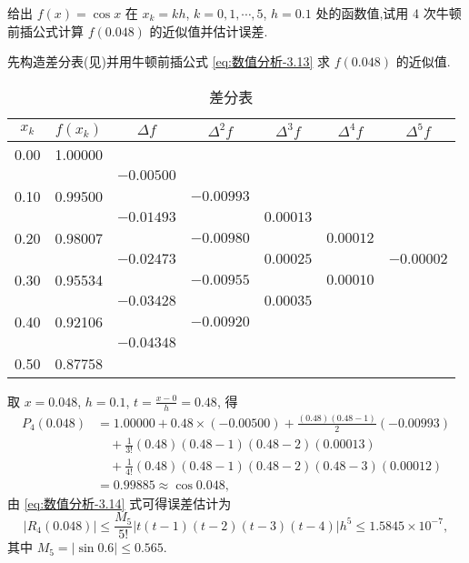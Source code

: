 \documentclass[../../main.tex]{subfiles}
\begin{document}
\begin{example}
给出 $f(x) = \cos x$ 在 $x_k = kh$, $k = 0, 1, \cdots, 5$, $h = 0.1$ 处的函数值,试用 4 次牛顿前插公式计算 $f(0.048)$ 的近似值并估计误差.
\end{example}
\begin{solution}
先构造差分表(见)并用牛顿前插公式 \eqref{eq:数值分析-3.13} 求 $f(0.048)$ 的近似值.
\begin{table}[H]
\centering
\caption{差分表}
\label{tab:difference-table12312344343452345634456}
\begin{tabular}{c c c c c c c}
\toprule
$x_k$ & $f(x_k)$ & $\Delta f$ & $\Delta^2 f$ & $\Delta^3 f$ & $\Delta^4 f$ & $\Delta^5 f$ \\
\midrule
0.00 & 1.00000 &  &  &  &  &  \\
&  & $-0.00500$ &  &  &  &  \\
0.10 & 0.99500 &  & $-0.00993$ &  &  &  \\
&  & $-0.01493$ &  & $0.00013$ &  &  \\
0.20 & 0.98007 &  & $-0.00980$ &  & $0.00012$ &  \\
&  & $-0.02473$ &  & $0.00025$ &  & $-0.00002$ \\
0.30 & 0.95534 &  & $-0.00955$ &  & $0.00010$ &  \\
&  & $-0.03428$ &  & $0.00035$ &  &  \\
0.40 & 0.92106 &  & $-0.00920$ &  &  &  \\
&  & $-0.04348$ &  &  &  &  \\
0.50 & 0.87758 &  &  &  &  &  \\
\bottomrule
\end{tabular}
\end{table}
取 $x = 0.048$, $h = 0.1$, $t = \frac{x - 0}{h} = 0.48$, 得
\begin{align*}
P_4(0.048) &= 1.00000 + 0.48 \times (-0.00500) + \frac{(0.48)(0.48 - 1)}{2}(-0.00993) \\
&\quad + \frac{1}{3!}(0.48)(0.48 - 1)(0.48 - 2)(0.00013) \\
&\quad + \frac{1}{4!}(0.48)(0.48 - 1)(0.48 - 2)(0.48 - 3)(0.00012) \\
&= 0.99885 \approx \cos 0.048,
\end{align*}
由 \eqref{eq:数值分析-3.14} 式可得误差估计为
\[
|R_4(0.048)| \leqslant \frac{M_5}{5!} | t(t - 1)(t - 2)(t - 3)(t - 4) | h^5 \leqslant 1.5845 \times 10^{-7},
\]
其中 $M_5 = |\sin 0.6| \leqslant 0.565$.
\end{solution}
\end{document}

